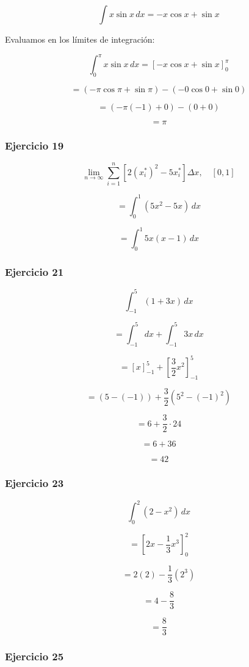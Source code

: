 \[
\int x \sin x \,dx = -x \cos x + \sin x
\]

Evaluamos en los límites de integración:

\[
\int_{0}^{\pi} x \sin x \,dx = \left[ -x \cos x + \sin x \right]_{0}^{\pi}
\]

\[
= \left( -\pi \cos \pi + \sin \pi \right) - \left( -0 \cos 0 + \sin 0 \right)
\]

\[
= (-\pi (-1) + 0) - (0 + 0)
\]

\[
= \pi
\]

\subsubsection*{Ejercicio 19}

\[
\lim_{n \to \infty} \sum_{i=1}^{n} \left[ 2(x_i^*)^2 - 5x_i^* \right] \Delta x, \quad [0,1]
\]

\[
= \int_{0}^{1} (5x^2 - 5x) \,dx
\]

\[
= \int_{0}^{1} 5x(x - 1) \,dx
\]

\subsubsection*{Ejercicio 21}

\[
\int_{-1}^{5} (1 + 3x) \,dx
\]

\[
= \int_{-1}^{5} dx + \int_{-1}^{5} 3x \,dx
\]

\[
= \left[ x \right]_{-1}^{5} + \left[ \frac{3}{2} x^2 \right]_{-1}^{5}
\]

\[
= (5 - (-1)) + \frac{3}{2} \left( 5^2 - (-1)^2 \right)
\]

\[
= 6 + \frac{3}{2} \cdot 24
\]

\[
= 6 + 36
\]

\[
= 42
\]


\subsubsection*{Ejercicio 23}

\[
\int_{0}^{2} (2 - x^2) \,dx
\]

\[
= \left[ 2x - \frac{1}{3}x^3 \right]_{0}^{2}
\]

\[
= 2(2) - \frac{1}{3} (2^3)
\]

\[
= 4 - \frac{8}{3}
\]

\[
= \frac{8}{3}
\]

\subsubsection*{Ejercicio 25}

